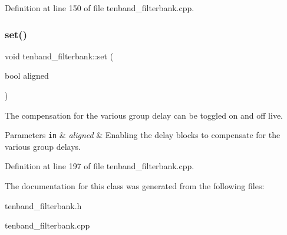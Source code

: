 Definition at line 150 of file tenband\+\_\+filterbank.\+cpp.

\mbox{\label{classtenband__filterbank_a170a3e7896129748d8b33b7adbf44866}} 
\subsubsection{\texorpdfstring{set()}{set()}}
{\footnotesize\ttfamily void tenband\+\_\+filterbank\+::set (\begin{DoxyParamCaption}\item[{bool}]{aligned }\end{DoxyParamCaption})}



The compensation for the various group delay can be toggled on and off live. 


\begin{DoxyParams}[1]{Parameters}
\mbox{\tt in}  & {\em aligned} & Enabling the delay blocks to compensate for the various group delays. \\
\hline
\end{DoxyParams}


Definition at line 197 of file tenband\+\_\+filterbank.\+cpp.



The documentation for this class was generated from the following files\+:\begin{DoxyCompactItemize}
\item 
tenband\+\_\+filterbank.\+h\item 
tenband\+\_\+filterbank.\+cpp\end{DoxyCompactItemize}
